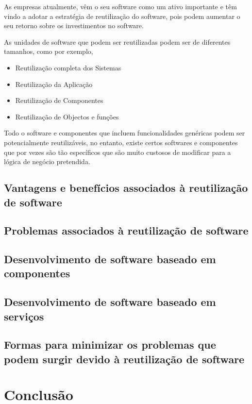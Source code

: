 \documentclass[runningheads]{llncs}
\begin{document}
As empresas atualmente, vêm o seu software como um ativo importante e têm vindo a  adotar a estratégia de reutilização do software, pois podem aumentar o seu retorno sobre os investimentos no software.\par
As unidades de software que podem ser reutilizadas podem ser de diferentes tamanhos, como por exemplo,
\begin{itemize}
    \item Reutilização completa dos Sistemas
    \item Reutilização da Aplicação
    \item Reutilização de Componentes
    \item Reutilização de Objectos e funções
\end{itemize}
Todo o software e componentes que incluem funcionalidades genéricas podem ser potencialmente reutilizáveis, no entanto, existe certos softwares e componentes que por vezes são tão específicos que são muito custosos de modificar para a lógica de negócio pretendida.
\subsection{Vantagens e benefícios associados à reutilização de software}

\subsection{Problemas associados à reutilização de software}

\subsection{Desenvolvimento de software baseado em componentes}


\subsection{Desenvolvimento de software baseado em serviços}



\subsection{Formas para minimizar os problemas que podem surgir devido à reutilização de software}

\section{Conclusão}
\end{document}
